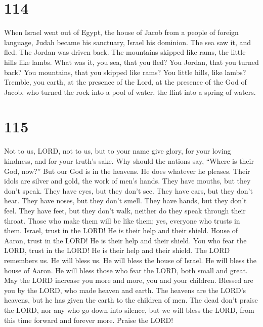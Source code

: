\hypertarget{section-106}{%
\section{114}\label{section-106}}

 When Israel went out of Egypt, the house of Jacob from a
people of foreign language,  Judah became his sanctuary,
Israel his dominion.  The sea saw it, and fled. The Jordan
was driven back.  The mountains skipped like rams, the
little hills like lambs.  What was it, you sea, that you
fled? You Jordan, that you turned back?  You mountains,
that you skipped like rams? You little hills, like lambs? 
Tremble, you earth, at the presence of the Lord, at the presence of the
God of Jacob,  who turned the rock into a pool of water,
the flint into a spring of waters.

\hypertarget{section-107}{%
\section{115}\label{section-107}}

 Not to us, LORD, not to us, but to your name give glory,
for your loving kindness, and for your truth's sake.  Why
should the nations say, ``Where is their God, now?''  But
our God is in the heavens. He does whatever he pleases. 
Their idols are silver and gold, the work of men's hands. 
They have mouths, but they don't speak. They have eyes, but they don't
see.  They have ears, but they don't hear. They have
noses, but they don't smell.  They have hands, but they
don't feel. They have feet, but they don't walk, neither do they speak
through their throat.  Those who make them will be like
them; yes, everyone who trusts in them.  Israel, trust in
the LORD! He is their help and their shield.  House of
Aaron, trust in the LORD! He is their help and their shield.
 You who fear the LORD, trust in the LORD! He is their
help and their shield.  The LORD remembers us. He will
bless us. He will bless the house of Israel. He will bless the house of
Aaron.  He will bless those who fear the LORD, both small
and great.  May the LORD increase you more and more, you
and your children.  Blessed are you by the LORD, who made
heaven and earth.  The heavens are the LORD's heavens,
but he has given the earth to the children of men.  The
dead don't praise the LORD, nor any who go down into silence,
 but we will bless the LORD, from this time forward and
forever more. Praise the LORD!

